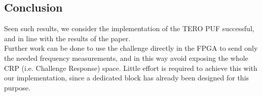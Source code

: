 \subsection{Conclusion}
Seen such results, we consider the implementation of the TERO PUF successful, and in line with the results of the paper. \\
Further work can be done to use the challenge directly in the FPGA to send only the needed frequency measurements, and in this way avoid
exposing the whole CRP (i.e. Challenge Response) space. Little effort is required to achieve this with our implementation, since a dedicated block has already been
designed for this purpose.